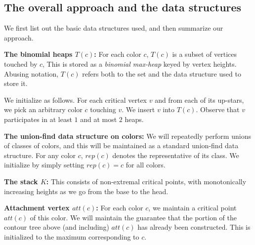 \documentclass[11pt]{article}
\newcommand{\ignore}[1]{}
\theoremstyle{definition}
\newcommand{\col}{col}
\newcommand{\h}{att}
\newcommand{\mcol}{mcol}
\newcommand{\rep}{rep}
\newcommand{\st}{K}
\newcommand{\touch}{T}
\begin{document}
\subsection{The overall approach and the data structures} \label{sec:struct}

We first list out the basic data structures used, and then summarize our approach.

\medskip
\noindent
{\bf The binomial heaps $\touch(c)$:} For each color $c$, $\touch(c)$ is a subset of vertices touched by $c$,
This is stored as a \emph{binomial max-heap} keyed by vertex heights. Abusing notation, $\touch(c)$ refers
both to the set and the data structure used to store it.

We initialize as follows. For each critical vertex $v$ and from each of its up-stars, we pick an arbitrary color $c$ touching $v$. 
We insert $v$ into $T(c)$. Observe that $v$ participates in at least $1$ and at most $2$ heaps.


\medskip
\noindent
{\bf The union-find data structure on colors:} We will repeatedly perform unions
of classes of colors, and this will be maintained as a standard union-find data structure.
For any color $c$, $\rep(c)$ denotes the representative of its class. We initialize
by simply setting $\rep(c) = c$ for all colors.


\medskip
\noindent
{\bf The stack $\st$:} This consists of non-extremal critical points, with monotonically increasing
heights as we go from the base to the head.
\ignore{
Each point $x \in \st$ has an associated subset of $\col(x)$, denoted $\mcol(x)$.
Both $\mcol(x)$ and its complement are stored as hash table. So lookups, inserts, and deletes
are in these sets are all constant time operations. The stack is guaranteed to satisfy 
the following invariants.
\begin{asparaitem}
	\item For every $x \in \st$: For every $c \in \mcol(x)$, $x$ is the highest element
	in $T(c)$. Furthermore, $c = \rep(c)$.
	\item Consider $x, y \in \st$ such that $y$ was pushed on $x$. There exists $c \in \col(x) \setminus
	\mcol(x)$ such that $x$ is not highest in $T(c)$ but $y$ is highest in $T(c)$.
\end{asparaitem}
}

\medskip
\noindent
{\bf Attachment vertex $\h(c)$:} For each color $c$, we maintain a critical point $\h(c)$ of this color.
We will maintain the guarantee that the portion of the contour tree above (and including) $\h(c)$ has already been constructed.
This is initialized to the maximum corresponding to $c$.
\end{document}
